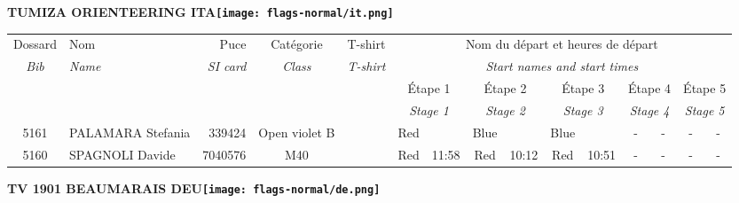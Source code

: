 \documentclass{report}
\begin{document}
\newpage
  \Huge \centering \bfseries TUMIZA ORIENTEERING  ITA\normalfont \footnotesize \sffamily \hfill \texttt{[image: flags-normal/it.png]} \newline 
  \begin{longtable}{|c|l|r|c|c|*{5}{cc|}}
    Dossard & Nom  & Puce    & Catégorie & T-shirt & \multicolumn{10}{c|}{Nom du départ et heures de départ} \\
    \itshape Bib     & \itshape Name & \itshape SI card & \itshape Class  & \itshape  T-shirt  & \multicolumn{10}{c|}{\itshape Start names and start times} \\
    \hline
    & & & & & \multicolumn{2}{c|}{Étape 1} & \multicolumn{2}{c|}{Étape 2} & \multicolumn{2}{c|}{Étape 3} & \multicolumn{2}{c|}{Étape 4} & \multicolumn{2}{c|}{Étape 5} \\
    & & & & & \multicolumn{2}{c|}{\itshape Stage 1} & \multicolumn{2}{c|}{\itshape Stage 2} & \multicolumn{2}{c|}{\itshape Stage 3} & \multicolumn{2}{c|}{\itshape Stage 4} & \multicolumn{2}{c|}{\itshape Stage 5} \\
    \hline
    5161 & PALAMARA Stefania & 339424 & Open violet B &   & Red &   & Blue &   & Blue &   & - &  - & - &  -\\
    5160 & SPAGNOLI Davide & 7040576 & M40 &   & Red & 11:58 & Red & 10:12 & Red & 10:51 & - &  - & - &  -\\
  \end{longtable}
\newpage
  \Huge \centering \bfseries TV 1901 BEAUMARAIS  DEU\normalfont \footnotesize \sffamily \hfill \texttt{[image: flags-normal/de.png]} \newline 
\end{document}
